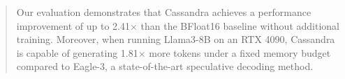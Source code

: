 \begin{abstract}
Our evaluation demonstrates that Cassandra achieves a performance improvement of up to 2.41$\times$ than the BFloat16 baseline without additional training. Moreover, when running Llama3-8B on an RTX 4090, Cassandra is capable of generating 1.81$\times$ more tokens under a fixed memory budget compared to Eagle-3, a state-of-the-art speculative decoding method.

\end{abstract}